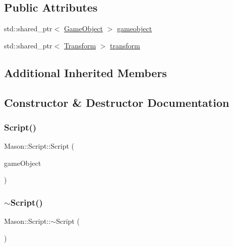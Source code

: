 \subsection*{Public Attributes}
\begin{DoxyCompactItemize}
\item 
std\+::shared\+\_\+ptr$<$ \hyperlink{class_mason_1_1_game_object}{Game\+Object} $>$ \hyperlink{class_mason_1_1_script_a26ffab9ad2a0f22cb6a3cba3029a985f}{gameobject}
\item 
std\+::shared\+\_\+ptr$<$ \hyperlink{class_mason_1_1_transform}{Transform} $>$ \hyperlink{class_mason_1_1_script_a480aa8b8f65245d51e41ceeaf9cab93a}{transform}
\end{DoxyCompactItemize}
\subsection*{Additional Inherited Members}


\subsection{Constructor \& Destructor Documentation}
\hypertarget{class_mason_1_1_script_a11d07693e51f3e22894784a6ae7a761d}{}\label{class_mason_1_1_script_a11d07693e51f3e22894784a6ae7a761d} 
\subsubsection{\texorpdfstring{Script()}{Script()}}
{\footnotesize\ttfamily Mason\+::\+Script\+::\+Script (\begin{DoxyParamCaption}\item[{\hyperlink{class_mason_1_1_game_object}{Game\+Object} $\ast$}]{game\+Object }\end{DoxyParamCaption})\hspace{0.3cm}{\ttfamily [inline]}}

\hypertarget{class_mason_1_1_script_a4778729c907c1f4b55f7ef06467d5c47}{}\label{class_mason_1_1_script_a4778729c907c1f4b55f7ef06467d5c47} 
\subsubsection{\texorpdfstring{$\sim$\+Script()}{~Script()}}
{\footnotesize\ttfamily Mason\+::\+Script\+::$\sim$\+Script (\begin{DoxyParamCaption}{ }\end{DoxyParamCaption})\hspace{0.3cm}{\ttfamily [inline]}}



